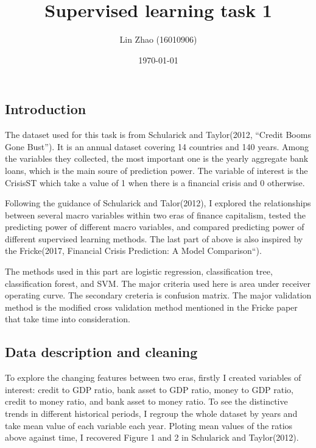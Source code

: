\documentclass{article}
\begin{document}
\title{Supervised learning task 1}
\author{Lin Zhao (16010906)}
\date{\today}
\maketitle

\newpage

\subsection*{Introduction}

The dataset used for this task is from Schularick and Taylor(2012,
``Credit Booms Gone Bust''). It is an annual dataset covering 14
countries and 140 years. Among the variables they collected, the most
important one is the yearly aggregate bank loans, which is 
the main soure of prediction power. The variable of interest is the
CrisisST which take a value of 1 when there is a financial crisis and 0
otherwise.

Following the guidance of Schularick and Talor(2012), I explored the
relationships between several macro variables within two
eras of finance capitalism, tested the predicting power of different
macro variables, and compared predicting power of different supervised
learning methods. The last part of above is also inspired by the
Fricke(2017, Financial Crisis Prediction: A Model Comparison``). 

The methods used in this part are logistic regression, classification
tree, classification forest, and SVM. The major criteria
used here is area under receiver operating curve. The secondary creteria
is confusion matrix. The major validation method is the modified cross
validation method mentioned in the Fricke paper that take time into
consideration.

\subsection*{Data description and cleaning}

To explore the changing features between two eras, firstly I created
variables of interest: credit to GDP ratio, bank asset to GDP ratio,
money to GDP ratio, credit to money ratio, and bank asset to money
ratio. To see the distinctive trends in different historical periods, I
regroup the whole dataset by years and take mean value of each variable
each year. Ploting mean values of the ratios above against time, I
recovered Figure 1 and 2 in Schularick and Taylor(2012).
\end{document}
